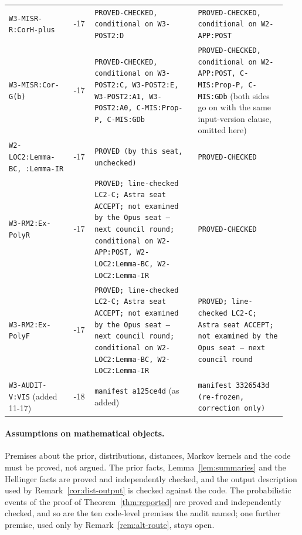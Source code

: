 {\begin{longtable}{@{}>{\raggedright\arraybackslash}p{0.22\linewidth}>{\raggedright\arraybackslash}p{0.07\linewidth}>{\raggedright\arraybackslash}p{0.35\linewidth}>{\raggedright\arraybackslash}p{0.3\linewidth}@{}}
\texttt{W3-MISR-R:CorH-plus} & 11-17 & \texttt{PROVED-CHECKED, conditional on W3-POST2:D} & \texttt{PROVED-CHECKED, conditional on W2-APP:POST} \\
\texttt{W3-MISR:Cor-G(b)} & 11-17 & \texttt{PROVED-CHECKED, conditional on W3-POST2:C, W3-POST2:E, W3-POST2:A1, W3-POST2:A0, C-MIS:Prop-P, C-MIS:GDb} & \texttt{PROVED-CHECKED, conditional on W2-APP:POST, C-MIS:Prop-P, C-MIS:GDb} (both sides go on with the same input-version clause, omitted here) \\
\texttt{W2-LOC2:Lemma-BC, :Lemma-IR} & 11-17 & \texttt{PROVED (by this seat, unchecked)} & \texttt{PROVED-CHECKED} \\
\texttt{W3-RM2:Ex-PolyR} & 11-17 & \texttt{PROVED; line-checked LC2-C; Astra seat ACCEPT; not examined by the Opus seat --- next council round; conditional on W2-APP:POST, W2-LOC2:Lemma-BC, W2-LOC2:Lemma-IR} & \texttt{PROVED-CHECKED} \\
\texttt{W3-RM2:Ex-PolyF} & 11-17 & \texttt{PROVED; line-checked LC2-C; Astra seat ACCEPT; not examined by the Opus seat --- next council round; conditional on W2-LOC2:Lemma-BC, W2-LOC2:Lemma-IR} & \texttt{PROVED; line-checked LC2-C; Astra seat ACCEPT; not examined by the Opus seat --- next council round} \\
\texttt{W3-AUDIT-V:VIS} (added 11-17) & 11-18 & \texttt{manifest a125ce4d} (as added) & \texttt{manifest 3326543d (re-frozen, correction only)} \\
\bottomrule\end{longtable}}

\paragraph{Assumptions on mathematical objects.} Premises about the prior, distributions, distances, Markov kernels and
the code must be proved, not argued. The prior facts, Lemma~\ref{lem:summaries} and the Hellinger facts are proved and
independently checked, and the output description used by Remark~\ref{cor:dist-output} is checked against the code.
The probabilistic events of the proof of Theorem~\ref{thm:reported} are proved and independently checked, and so are the
ten code-level premises the audit named; one further premise, used only by Remark~\ref{rem:alt-route}, stays open.

